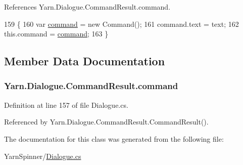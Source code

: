 References Yarn.\-Dialogue.\-Command\-Result.\-command.


\begin{DoxyCode}
159                                                \{
160                 var \hyperlink{a00052_a420ca0984d6e5c33bb761654305c592e}{command} = \textcolor{keyword}{new} Command();
161                 command.text = text;
162                 this.command = \hyperlink{a00052_a420ca0984d6e5c33bb761654305c592e}{command};
163             \}
\end{DoxyCode}


\subsection{Member Data Documentation}
\hypertarget{a00052_a420ca0984d6e5c33bb761654305c592e}{
\subsubsection[{command}]{ Yarn.\-Dialogue.\-Command\-Result.\-command}}\label{a00052_a420ca0984d6e5c33bb761654305c592e}


Definition at line 157 of file Dialogue.\-cs.



Referenced by Yarn.\-Dialogue.\-Command\-Result.\-Command\-Result().



The documentation for this class was generated from the following file\-:\begin{DoxyCompactItemize}
\item 
Yarn\-Spinner/\hyperlink{a00305}{Dialogue.\-cs}\end{DoxyCompactItemize}
